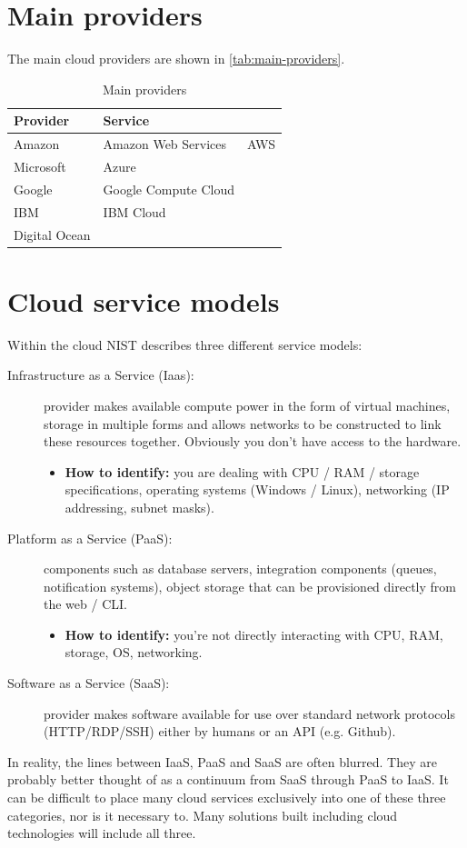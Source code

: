 \documentclass{pgnotes}
\begin{document}
\section{Main providers}
\label{sec:main-providers}

The main cloud providers are shown in \autoref{tab:main-providers}.

\begin{table}[htbp]
  \centering
  \begin{tabular}{l l l}
    \toprule
    \textbf{Provider} & \textbf{Service} & ~ \\ 
    \midrule
    Amazon & Amazon Web Services & AWS \\
    Microsoft & Azure & ~ \\
    Google & Google Compute Cloud & \\
    IBM & IBM Cloud & \\
    Digital Ocean & & \\
    \bottomrule
  \end{tabular}
  \caption{Main providers}
  \label{tab:main-providers}
\end{table}

\section{Cloud service models}
\label{sec:cloud-service-models}

Within the cloud NIST describes three different service models:
\begin{description}
\item[Infrastructure as a Service (Iaas):] provider makes available compute power in the form of virtual machines, storage in multiple forms and allows networks to be constructed to link these resources together. Obviously you don't have access to the hardware.
  \begin{itemize}
  \item \textbf{How to identify:} you are dealing with CPU / RAM / storage specifications, operating systems (Windows / Linux), networking (IP addressing, subnet masks).
  \end{itemize}
\item[Platform as a Service (PaaS):] components such as database servers, integration components (queues, notification systems), object storage that can be provisioned directly from the web / CLI. 
  \begin{itemize}
  \item \textbf{How to identify:} you're not directly interacting with CPU, RAM, storage, OS, networking.
  \end{itemize}
\item[Software as a Service (SaaS):] provider makes software available for use over standard network protocols (HTTP/RDP/SSH) either by humans or an API (e.g. Github).  
\end{description}
In reality, the lines between IaaS, PaaS and SaaS are often blurred.
They are probably better thought of as a continuum from SaaS through PaaS to IaaS. 
It can be difficult to place many cloud services exclusively into one of these three categories, nor is it necessary to.
Many solutions built including cloud technologies will include all three.
\end{document}
